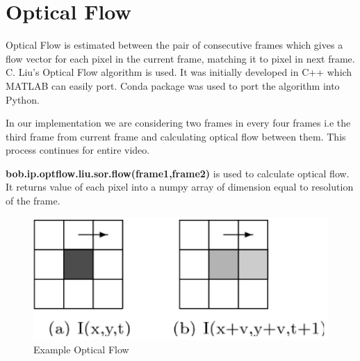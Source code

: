 \section{Optical Flow}
Optical Flow is estimated between the pair of consecutive frames which gives a flow vector for each pixel in the current frame, matching it to pixel in next frame. C. Liu’s Optical Flow algorithm is used. It was initially developed in C++ which MATLAB can easily port. Conda package was used to port the algorithm into Python. \par
	In our implementation we are considering two frames in every four frames i.e the third frame from current frame and calculating optical flow between them. This process continues for entire video. \par \textbf{bob.ip.optflow.liu.sor.flow(frame1,frame2)} is used to calculate optical flow. It returns value of each pixel into a numpy array of dimension equal to resolution of the frame.
\begin{center}
\begin{figure}[H]
\centering
\includegraphics[width = \linewidth]{optical_flow.png}
\caption{Example Optical Flow}
\end{figure}
\end{center}

